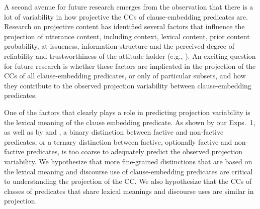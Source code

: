 \documentclass[11pt,fleqn]{article}
\newcommand{\6}{\mbox{$[\hspace*{-.6mm}[$}}
\newcommand{\9}{\mbox{$]\hspace*{-.6mm}]$}}
\begin{document}
A second avenue for future research emerges from the observation that there is a lot of variability in how projective the CCs of clause-embedding predicates are. Research on projective content has identified several factors that influence the projection of utterance content, including context, lexical content, prior content probability, at-issueness, information structure and the perceived degree of reliability and trustworthiness of the attitude holder (e.g., \citealt{gazdar79a,gazdar79b,beaver-belly,schlenker10,brst-salt10,best-question,abrusan2011,abrusan2016,anand-hacquard2014,cummins-rohde2015,djaerv-bacovcin-salt27,tonhauser-salt26,tonhauser-guarani-variability,tbd-variability,tonhauser-etal-sub23}). An exciting question for future research is whether these factors are implicated in the projection of the CCs of all clause-embedding predicates, or only of particular subsets, and how they contribute to the observed projection variability between clause-embedding predicates. 

One of the factors that clearly plays a role in predicting projection variability is the lexical meaning of the clause embedding predicate. As shown by our Exps.~1, as well as by \citealt{tbd-variability} and \citealt{demarneffe-etal-sub23}, a binary distinction between factive and non-factive predicates, or a ternary distinction between factive, optionally factive and non-factive predicates, is too coarse to adequately predict the observed projection variability. We hypothesize that more fine-grained distinctions that are based on the lexical meaning and discourse use of clause-embedding predicates are critical to understanding the projection of the CC. We also hypothesize that the CCs of classes of predicates that share lexical meanings and discourse uses are similar in projection. 
\end{document}
